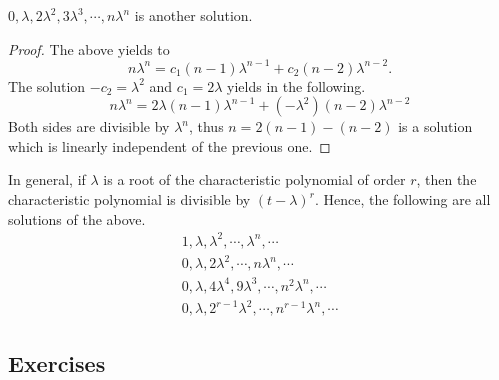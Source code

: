\begin{claim}
$0, \lambda, 2 \lambda^2, 3 \lambda^3, \cdots, n \lambda^n$ is another solution.
\end{claim}
\begin{proof}
The above yields to
$$
n \lambda^n = c_1 (n-1)\lambda^{n-1} + c_2 (n-2)\lambda^{n-2}.
$$
The solution $-c_2=\lambda^2$ and $c_1=2 \lambda$ yields in the following.
$$
n \lambda^n = 2 \lambda(n-1)\lambda^{n-1} + (-\lambda^2)(n-2)\lambda^{n-2}
$$
Both sides are divisible by $\lambda^n$, thus $n=2(n-1)-(n-2)$ is a solution which is linearly independent of the previous one.
\end{proof}

In general, if $\lambda$ is a root of the characteristic polynomial of order $r$, then the characteristic polynomial is divisible by $(t- \lambda)^r$.
Hence, the following are all solutions of the above.
\begin{align*}
1, \lambda, \lambda^2, \cdots, \lambda^n, \cdots \\
0, \lambda, 2 \lambda^2, \cdots, n \lambda^n, \cdots \\
0, \lambda, 4 \lambda^4, 9 \lambda^3, \cdots, n^2 \lambda^n, \cdots \\
0, \lambda, 2^{r-1} \lambda^2, \cdots, n^{r-1}\lambda^n, \cdots
\end{align*}

\subsection{Exercises}

